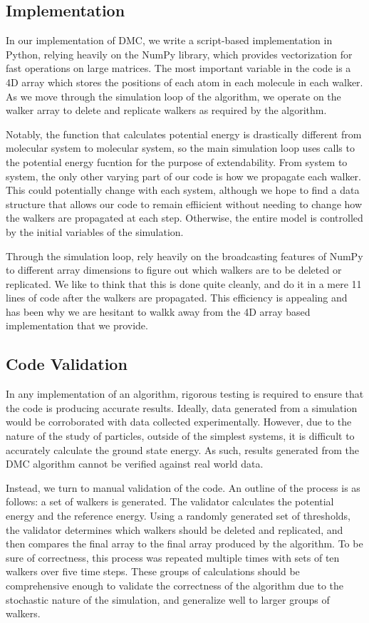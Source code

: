 \documentclass[journal=jacsat,manuscript=article]{achemso}
\begin{document}
\subsection{Implementation}
In our implementation of DMC, we write a script-based implementation in Python, relying heavily on the NumPy library, which provides vectorization for fast operations on large matrices. The most important variable in the code is a 4D array which stores the positions of each atom in each molecule in each walker. As we move through the simulation loop of the algorithm, we operate on the walker array to delete and replicate walkers as required by the algorithm.

Notably, the function that calculates potential energy is drastically different from molecular system to molecular system, so the main simulation loop uses calls to the potential energy fucntion for the purpose of extendability. From system to system, the only other varying part of our code is how we propagate each walker. This could potentially change with each system, although we hope to find a data structure that allows our code to remain effiicient without needing to change how the walkers are propagated at each step. Otherwise, the entire model is controlled by the initial variables of the simulation.

Through the simulation loop, rely heavily on the broadcasting features of NumPy to different array dimensions to figure out which walkers are to be deleted or replicated. We like to think that this is done quite cleanly, and do it in a mere 11 lines of code after the walkers are propagated. This efficiency is appealing and has been why we are hesitant to walkk away from the 4D array based implementation that we provide. 
\subsection{Code Validation}

In any implementation of an algorithm, rigorous testing is required to ensure that the code is producing accurate results. Ideally, data generated from a simulation would be corroborated with data collected experimentally. However, due to the nature of the study of particles, outside of the simplest systems, it is difficult to accurately calculate the ground state energy. As such, results generated from the DMC algorithm cannot be verified against real world data. 

Instead, we turn to manual validation of the code. An outline of the process is as follows: a set of walkers is generated. The validator calculates the potential energy and the reference energy. Using a randomly generated set of thresholds, the validator determines which walkers should be deleted and replicated, and then compares the final array to the final array produced by the algorithm. To be sure of correctness, this process was repeated multiple times with sets of ten walkers over five time steps. These groups of calculations should be comprehensive enough to validate the correctness of the algorithm due to the stochastic nature of the simulation, and generalize well to larger groups of walkers. 
\end{document}
